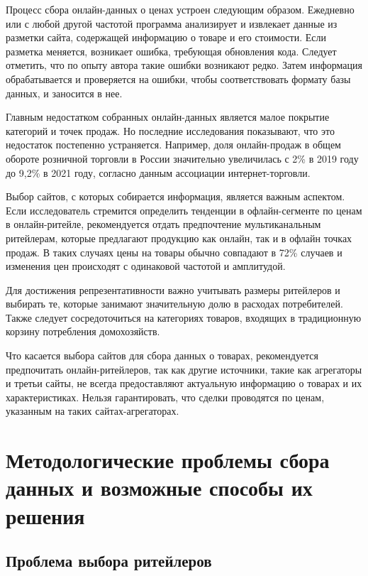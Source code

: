 Процесс сбора онлайн-данных о ценах устроен следующим образом. Ежедневно или с любой другой частотой программа анализирует и извлекает данные из разметки сайта, содержащей информацию о товаре и его стоимости. Если разметка меняется, возникает ошибка, требующая обновления кода. Следует отметить, что по опыту автора такие ошибки возникают редко. Затем информация обрабатывается и проверяется на ошибки, чтобы соответствовать формату базы данных, и заносится в нее.

Главным недостатком собранных онлайн-данных является малое покрытие категорий и точек продаж. Но последние исследования показывают, что это недостаток постепенно устраняется. Например, доля онлайн-продаж в общем обороте розничной торговли в России значительно увеличилась с 2\% в 2019 году до 9,2\% в 2021 году, согласно данным ассоциации интернет-торговли.

Выбор сайтов, с которых собирается информация, является важным аспектом. Если исследователь стремится определить тенденции в офлайн-сегменте по ценам в онлайн-ритейле, рекомендуется отдать предпочтение мультиканальным ритейлерам, которые предлагают продукцию как онлайн, так и в офлайн точках продаж. В таких случаях цены на товары обычно совпадают в 72\% случаев и изменения цен происходят с одинаковой частотой и амплитудой.

Для достижения репрезентативности важно учитывать размеры ритейлеров и выбирать те, которые занимают значительную долю в расходах потребителей. Также следует сосредоточиться на категориях товаров, входящих в традиционную корзину потребления домохозяйств.

Что касается выбора сайтов для сбора данных о товарах, рекомендуется предпочитать онлайн-ритейлеров, так как другие источники, такие как агрегаторы и третьи сайты, не всегда предоставляют актуальную информацию о товарах и их характеристиках. Нельзя гарантировать, что сделки проводятся по ценам, указанным на таких сайтах-агрегаторах.

\section{Методологические проблемы сбора данных и возможные способы их решения}\label{sec:ch2/sec2}


\subsection{Проблема выбора ритейлеров}\label{subsec:ch2/sec2/sub1}

